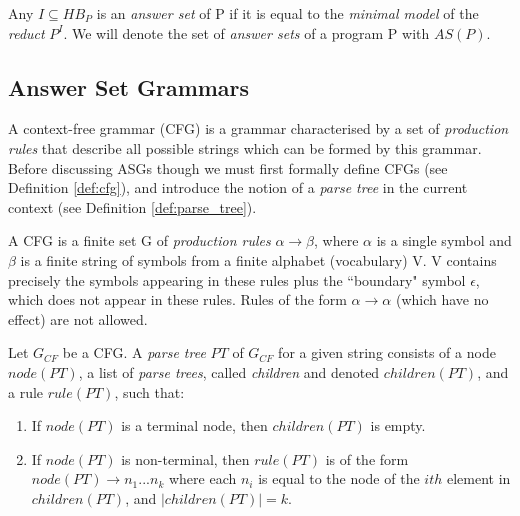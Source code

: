 \begin{definition}
\label{def:answer_set}
Any $I \subseteq HB_P$ is an \textit{answer set} of P if it is equal to the \textit{minimal model}  of the \textit{reduct} $P^I$. We will denote the set of \textit{answer sets} of a program P with $AS(P)$. 
\end{definition}

\subsection{Answer Set Grammars}

A context-free grammar (CFG) is a grammar characterised by a set of \textit{production rules} that describe all possible strings which can be formed by this grammar. Before discussing ASGs though we must first formally define CFGs (see Definition \ref{def:cfg}), and introduce the notion of a \textit{parse tree} in the current context (see Definition \ref{def:parse_tree}).

\begin{definition}
\label{def:cfg}
A CFG is a finite set G of \textit{production rules} $\alpha \to \beta$, where $\alpha$ is a single symbol and $\beta$ is a finite string of symbols from a finite alphabet (vocabulary) V. V contains precisely the symbols appearing in these rules plus the ``boundary" symbol $\epsilon$, which does not appear in these rules. Rules of the form $\alpha \to \alpha$ (which have no effect) are not allowed.
\end{definition}

\begin{definition}
\label{def:parse_tree}
Let $G_{CF}$ be a CFG. A \textit{parse tree} $PT$ of $G_{CF}$ for a given string consists of a node $node(PT)$, a list of \textit{parse trees}, called \textit{children} and denoted $children(PT)$, and a rule $rule(PT)$, such that:
\begin{enumerate}[nolistsep]
\item If $node(PT)$ is a terminal node, then $children(PT)$ is empty.
\item If $node(PT)$ is non-terminal, then $rule(PT)$ is of the form $node(PT) \to n_1 ... n_k$ where each $n_i$ is equal to the node of the $ith$ element in $children(PT)$, and $|children(PT)| = k$.
\end{enumerate}
\end{definition}

